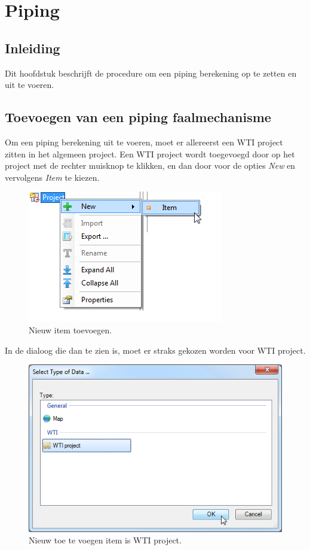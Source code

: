 
\chapter{Piping\label{chap:piping}}

\section{Inleiding}
Dit hoofdstuk beschrijft de procedure om een piping berekening op te zetten en uit te voeren. 

\section{Toevoegen van een piping faalmechanisme}
\label{sec:addpiping}
Om een piping berekening uit te voeren, moet er allereerst een WTI project zitten in het algemeen project. Een WTI project wordt toegevoegd door op het project met de rechter muisknop te klikken, en dan door voor de opties \textit{New} en vervolgens \textit{Item} te kiezen.

\begin{figure} [H]
	\centering
		\includegraphics{figures/chapter_piping/addNewProject}
	\caption{Nieuw item toevoegen.}
	\label{fig:fig5.1}
\end{figure}

In de dialoog die dan te zien is, moet er straks gekozen worden voor WTI project.

\begin{figure} [H]
	\centering
		\includegraphics{figures/chapter_piping/selectWTIProject}
	\caption{Nieuw toe te voegen item is WTI project.}
	\label{fig:fig5.2}
\end{figure}

